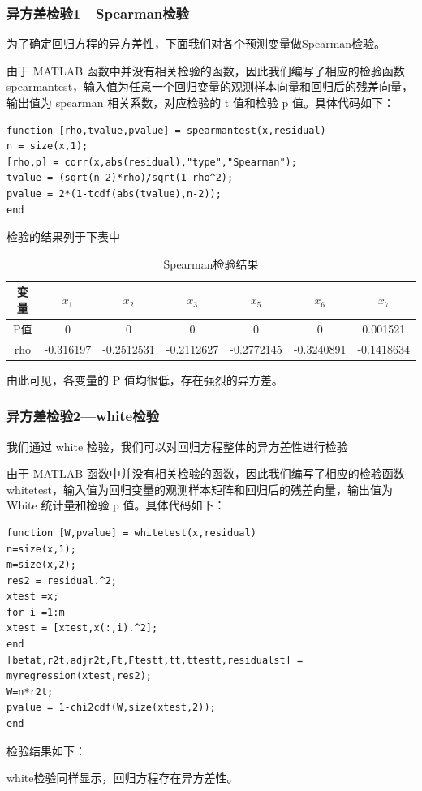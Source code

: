 \documentclass[11pt]{article}
\begin{document}
\subsubsection*{异方差检验1---Spearman检验}
为了确定回归方程的异方差性，下面我们对各个预测变量做Spearman检验。

由于 MATLAB 函数中并没有相关检验的函数，因此我们编写了相应的检验函数 spearmantest，输入值为任意一个回归变量的观测样本向量和回归后的残差向量，输出值为 spearman 相关系数，对应检验的 t 值和检验 p 值。具体代码如下：
\begin{lstlisting}
function [rho,tvalue,pvalue] = spearmantest(x,residual)
n = size(x,1);
[rho,p] = corr(x,abs(residual),"type","Spearman");
tvalue = (sqrt(n-2)*rho)/sqrt(1-rho^2);
pvalue = 2*(1-tcdf(abs(tvalue),n-2));
end
\end{lstlisting}

检验的结果列于下表中
\begin{table}[H]
	\centering
	\caption{Spearman检验结果}
	\begin{tabular}{ccccccc}
		\hline
		变量& $x_1$    & $x_2$    & $x_3$   &   $x_5$    & $x_6$    & $x_7$\\
		\hline
		P值&0&0&0&0&0&0.001521\\
		rho&-0.316197&-0.2512531&-0.2112627&-0.2772145 &-0.3240891&-0.1418634\\
		\hline
	\end{tabular}
\end{table}

由此可见，各变量的 P 值均很低，存在强烈的异方差。

\subsubsection*{异方差检验2---white检验}
我们通过 white 检验，我们可以对回归方程整体的异方差性进行检验

由于 MATLAB 函数中并没有相关检验的函数，因此我们编写了相应的检验函数 whitetest，输入值为回归变量的观测样本矩阵和回归后的残差向量，输出值为 White 统计量和检验 p 值。具体代码如下：
\begin{lstlisting}
function [W,pvalue] = whitetest(x,residual)
n=size(x,1);
m=size(x,2);
res2 = residual.^2;
xtest =x;
for i =1:m
xtest = [xtest,x(:,i).^2];
end
[betat,r2t,adjr2t,Ft,Ftestt,tt,ttestt,residualst] = myregression(xtest,res2);
W=n*r2t;
pvalue = 1-chi2cdf(W,size(xtest,2));
end
\end{lstlisting}

检验结果如下：
\begin{center}
\end{center}
white检验同样显示，回归方程存在异方差性。
\end{document}
